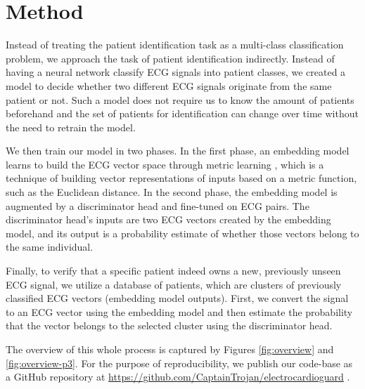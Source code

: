 \documentclass[preprint,12pt]{elsarticle}
\begin{document}
\section{Method}

Instead of treating the patient identification task as a multi-class classification problem, we approach the task of patient identification indirectly. Instead of having a neural network classify ECG signals into patient classes, we created a model to decide whether two different ECG signals originate from the same patient or not. Such a model does not require us to know the amount of patients beforehand and the set of patients for identification can change over time without the need to retrain the model.

We then train our model in two phases. In the first phase, an embedding model learns to build the ECG vector space through metric learning \cite{kaya2019deep}, which is a technique of building vector representations of inputs based on a metric function, such as the Euclidean distance. In the second phase, the embedding model is augmented by a discriminator head and fine-tuned on ECG pairs. The discriminator head's inputs are two ECG vectors created by the embedding model, and its output is a probability estimate of whether those vectors belong to the same individual.

Finally, to verify that a specific patient indeed owns a new, previously unseen ECG signal, we utilize a database of patients, which are clusters of previously classified ECG vectors (embedding model outputs). First, we convert the signal to an ECG vector using the embedding model and then estimate the probability that the vector belongs to the selected cluster using the discriminator head. 

The overview of this whole process is captured by Figures \ref{fig:overview} and \ref{fig:overview-p3}. For the purpose of reproducibility, we publish our code-base as a GitHub repository at \href{https://github.com/CaptainTrojan/electrocardioguard}{https://github.com/CaptainTrojan/electrocardioguard} .
\end{document}
